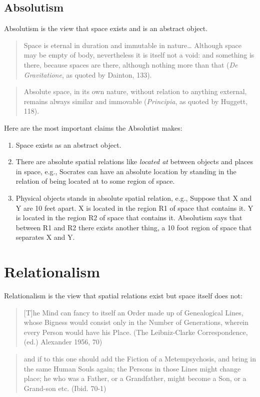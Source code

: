 \documentclass[oneside]{article}
\begin{document}
\subsection*{Absolutism}
Absolutism is the view that space exists and is an abstract object.
\begin{quote}
Space is eternal in duration and immutable in nature\ldots{} Although
space may be empty of body, nevertheless it is itself not a void: and
something is there, because spaces are there, although nothing more than
that (\emph{De Gravitatione}, as quoted by Dainton, 133).
\end{quote}

\begin{quote}
Absolute space, in its own nature, without relation to anything
external, remains always similar and immovable (\emph{Principia}, as quoted
by Huggett, 118).
\end{quote}
Here are the most important claims the Absolutist makes:
\begin{enumerate}
\item Space exists as an abstract object.
\item There are absolute spatial relations like \emph{located at} between objects and places in space, e.g., Socrates can have an absolute location by standing in the relation of being located at to some region of space. 
\item Physical objects stands in absolute spatial relation, e.g., Suppose that X and Y are 10 feet apart. X is located in the region R1 of space that contains it. Y is located in the region R2 of space that contains it. Absolutism says that between R1 and R2 there exists another thing, a 10
foot region of space that separates X and Y.
\end{enumerate}

\section*{Relationalism}
Relationalism is the view that spatial relations exist but space itself
does not:

\begin{quote}
{[}T{]}he Mind can fancy to itself an Order made up of Genealogical
Lines, whose Bigness would consist only in the Number of Generations,
wherein every Person would have his Place. (The Leibniz-Clarke
Correspondence, (ed.) Alexander 1956, 70)
\end{quote}

\begin{quote}
and if to this one should add the Fiction of a Metempsychosis, and bring
in the same Human Souls again; the Persons in those Lines might change
place; he who was a Father, or a Grandfather, might become a Son, or a
Grand-son etc. (Ibid. 70-1)
\end{quote}
\end{document}
